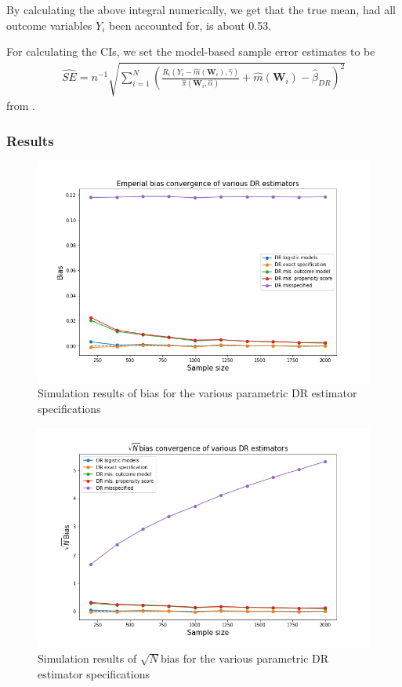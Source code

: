 \documentclass[12pt,twoside]{article}
\begin{document}
By calculating the above integral numerically, we get that the true mean, had all outcome variables $Y_i$ been accounted for, is about 0.53.

For calculating the CIs, we set the model-based sample error estimates to be 
\begin{align*}
    \hat{SE} = n^{-1} \sqrt{\sum_{i=1}^N \left(\frac{R_i(Y_i - \hat m(\mathbf{W}_i), \hat \gamma)}{\hat\pi(\mathbf{W}_i,\hat\alpha)} + \hat m(\mathbf{W}_i) - \hat{\beta}_{DR}\right)^2}
\end{align*}
from \citet{lunceford_davidian}. \\

\subsubsection*{Results}

\begin{figure}[h!]
    \centering
    \includegraphics[width = 0.9\columnwidth]{figures/biaspara.png}
    \caption{Simulation results of bias for the various parametric DR estimator specifications}
    \label{figbiaspara}
\end{figure}

\begin{figure}[h!]
    \centering
    \includegraphics[width = 0.9\columnwidth]{figures/sqrtnpara.png}
    \caption{Simulation results of $\sqrt{N}$bias for the various parametric DR estimator specifications}
    \label{figsqrtnpara}
\end{figure}
\end{document}
